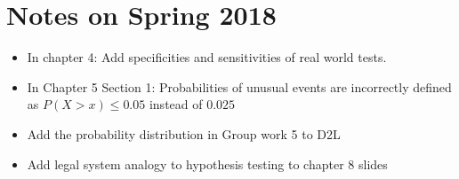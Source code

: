 \documentclass{article}
\begin{document}
\section{Notes on Spring 2018}

\begin{itemize}
\item In chapter 4: Add specificities and sensitivities of real world tests.

\item In Chapter 5 Section 1: Probabilities of unusual events are incorrectly defined as $P(X > x) \le 0.05$ instead of $0.025$

\item Add the probability distribution in Group work 5 to D2L

\item Add legal system analogy to hypothesis testing to chapter 8 slides

\end{itemize}
\end{document}
